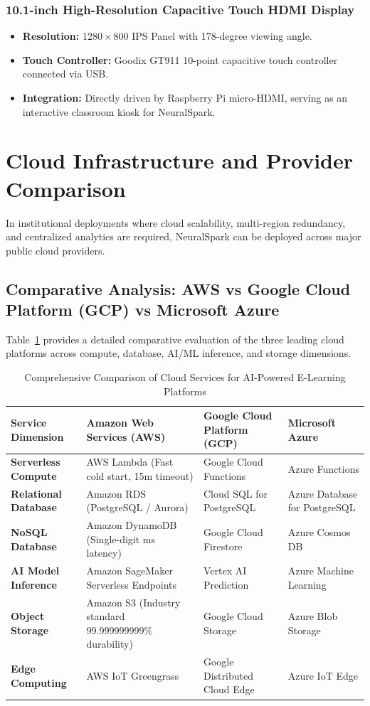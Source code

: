\subsubsection{10.1-inch High-Resolution Capacitive Touch HDMI Display}
\begin{itemize}[leftmargin=*]
    \item \textbf{Resolution:} $1280 \times 800$ IPS Panel with 178-degree viewing angle.
    \item \textbf{Touch Controller:} Goodix GT911 10-point capacitive touch controller connected via USB.
    \item \textbf{Integration:} Directly driven by Raspberry Pi micro-HDMI, serving as an interactive classroom kiosk for NeuralSpark.
\end{itemize}

\section{Cloud Infrastructure and Provider Comparison}
In institutional deployments where cloud scalability, multi-region redundancy, and centralized analytics are required, NeuralSpark can be deployed across major public cloud providers.

\subsection{Comparative Analysis: AWS vs Google Cloud Platform (GCP) vs Microsoft Azure}
Table~\ref{tab:cloud_comparison_matrix} provides a detailed comparative evaluation of the three leading cloud platforms across compute, database, AI/ML inference, and storage dimensions.

\begin{table}[H]
\centering
\caption{Comprehensive Comparison of Cloud Services for AI-Powered E-Learning Platforms}
\label{tab:cloud_comparison_matrix}
\small
\begin{tabularx}{\textwidth}{p{3.2cm} p{3.6cm} p{3.6cm} X}
\toprule
\textbf{Service Dimension} & \textbf{Amazon Web Services (AWS)} & \textbf{Google Cloud Platform (GCP)} & \textbf{Microsoft Azure} \\
\midrule
\textbf{Serverless Compute} & AWS Lambda (Fast cold start, 15m timeout) & Google Cloud Functions & Azure Functions \\
\textbf{Relational Database} & Amazon RDS (PostgreSQL / Aurora) & Cloud SQL for PostgreSQL & Azure Database for PostgreSQL \\
\textbf{NoSQL Database} & Amazon DynamoDB (Single-digit ms latency) & Google Cloud Firestore & Azure Cosmos DB \\
\textbf{AI Model Inference} & Amazon SageMaker Serverless Endpoints & Vertex AI Prediction & Azure Machine Learning \\
\textbf{Object Storage} & Amazon S3 (Industry standard 99.999999999\% durability) & Google Cloud Storage & Azure Blob Storage \\
\textbf{Edge Computing} & AWS IoT Greengrass & Google Distributed Cloud Edge & Azure IoT Edge \\
\bottomrule
\end{tabularx}
\end{table}


